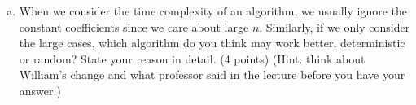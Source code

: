 \documentclass[11pt]{exam}
\begin{document}
\begin{enumerate}[(a)]
\begin{solution}
    ~\\
    ~\\
    ~\\
    ~\\
    ~\\
    ~\\
\end{solution}
\item When we consider the time complexity of an algorithm, we usually ignore the constant coefficients since we care about large $n$. Similarly, if we only consider the large cases, which algorithm do you think may work better, deterministic or random? State your reason in detail. (4 points) (Hint: think about William's change and what professor said in the lecture before you have your answer.)
\begin{solution}
    ~\\
    ~\\
    ~\\
    ~\\
\end{solution}
\end{enumerate}
\end{document}

